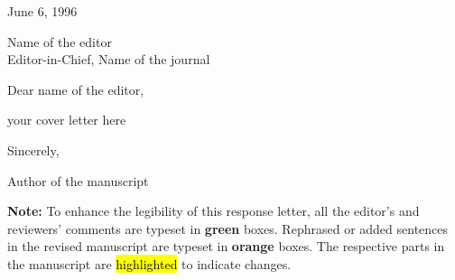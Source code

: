 \thispagestyle{empty}
\noindent June 6, 1996
\vspace{0.8cm}

\noindent Name of the editor\\
Editor-in-Chief, Name of the journal
\vspace{0.5cm}

\noindent Dear name of the editor,

your cover letter here


\vspace{4em}

\noindent Sincerely,

\noindent Author of the manuscript

\vfill
\textbf{Note:} To enhance the legibility of this response letter, all the editor's and reviewers' comments are typeset in \textcolor{colorcommentfg}{\textbf{green}} boxes. Rephrased or added sentences in the revised manuscript are typeset in \textcolor{colorchangebg}{\textbf{orange}} boxes. The respective parts in the manuscript are \hl{highlighted} to indicate changes.